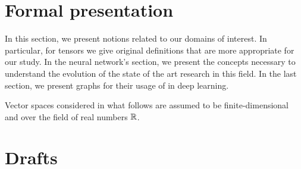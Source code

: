 \documentclass[12pt]{book}
\begin{document}

%
%

\dominitoc
\tableofcontents

%
%

%

%
%

%
%

\setcounter{chapter}{1}
\chapter{Formal presentation}

In this section, we present notions related to our domains of interest. In particular, for tensors we give original definitions that are more appropriate for our study. In the neural network's section, we present the concepts necessary to understand the evolution of the state of the art research in this field. In the last section, we present graphs for their usage of in deep learning.

Vector spaces considered in what follows are assumed to be finite-dimensional and over the field of real numbers $\mathbb{R}$.

\vfill
\minitoc
\newpage


\newpage


\newpage


\newpage

%
%

%
%

%
%

%
%

%
%

\setcounter{chapter}{-1}
\chapter{Drafts}

\newpage

%
%

\chapter*{}
\setcounter{chapter}{0}


\printbibliography[heading=bibintoc]
\end{document}
